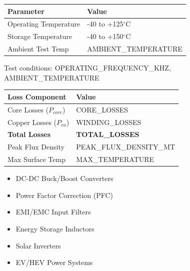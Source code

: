 \documentclass[10pt,a4paper]{article}
\begin{document}
\begin{minipage}[t]{0.45\textwidth}

\noindent{\large\bfseries\textcolor{headerblue}{Operating Conditions}}
\vspace{2mm}

{\footnotesize
\begin{tabular}{|l|l|}
\hline
\rowcolor{lightblue}
\textbf{Parameter} & \textbf{Value} \\
\hline
Operating Temperature & -40 to +125$^\circ$C \\
\hline
Storage Temperature & -40 to +150$^\circ$C \\
\hline
Ambient Test Temp & {{AMBIENT_TEMPERATURE}} \\
\hline
\end{tabular}
}

\vspace{4mm}

\noindent{\large\bfseries\textcolor{headerblue}{Loss Analysis}}
\vspace{2mm}

Test conditions: {{OPERATING_FREQUENCY_KHZ}}, {{AMBIENT_TEMPERATURE}}

{\footnotesize
\begin{tabular}{|l|l|}
\hline
\rowcolor{lightblue}
\textbf{Loss Component} & \textbf{Value} \\
\hline
Core Losses ($P_{core}$) & {{CORE_LOSSES}} \\
\hline
Copper Losses ($P_{cu}$) & {{WINDING_LOSSES}} \\
\hline
\textbf{Total Losses} & \textbf{{{TOTAL_LOSSES}}} \\
\hline
Peak Flux Density & {{PEAK_FLUX_DENSITY_MT}} \\
\hline
Max Surface Temp & {{MAX_TEMPERATURE}} \\
\hline
\end{tabular}
}

\vspace{4mm}

\noindent{\large\bfseries\textcolor{headerblue}{Typical Applications}}
\vspace{2mm}

{\footnotesize
\begin{itemize}
    \setlength{\itemsep}{0pt}
    \item DC-DC Buck/Boost Converters
    \item Power Factor Correction (PFC)
    \item EMI/EMC Input Filters
    \item Energy Storage Inductors
    \item Solar Inverters
    \item EV/HEV Power Systems
\end{itemize}
}


\end{minipage}
\end{document}
